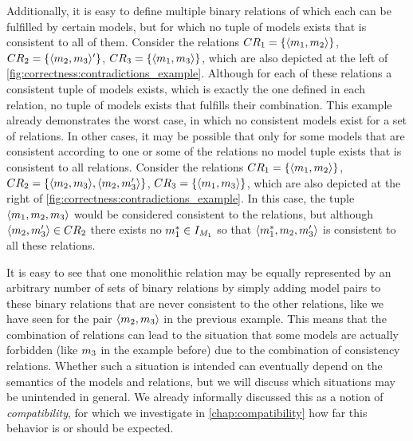 Additionally, it is easy to define multiple binary relations of which each can be fulfilled by certain models, but for which no tuple of models exists that is consistent to all of them. Consider the relations $\consistencyrelation{CR}{1} = \setted{\tupled{\model{m}{1}, \model{m}{2}}}$, $\consistencyrelation{CR}{2} = \setted{\tupled{\model{m}{2}, \model{m}{3}}'}$, $\consistencyrelation{CR}{3} = \setted{\tupled{\model{m}{1}, \model{m}{3}}}$, which are also depicted at the left of \autoref{fig:correctness:contradictions_example}.
Although for each of these relations a consistent tuple of models exists, which is exactly the one defined in each relation, no tuple of models exists that fulfills their combination.
This example already demonstrates the worst case, in which no consistent models exist for a set of relations.
In other cases, it may be possible that only for some models that are consistent according to one or some of the relations no model tuple exists that is consistent to all relations.
Consider the relations $\consistencyrelation{CR}{1} = \setted{\tupled{\model{m}{1}, \model{m}{2}}}$, $\consistencyrelation{CR}{2} = \setted{\tupled{\model{m}{2}, \model{m}{3}}, \tupled{\model{m}{2}, \model{m}{3}'}}$, $\consistencyrelation{CR}{3} = \setted{\tupled{\model{m}{1}, \model{m}{3}}}$, which are also depicted at the right of \autoref{fig:correctness:contradictions_example}.
In this case, the tuple $\tupled{\model{m}{1}, \model{m}{2}, \model{m}{3}}$ would be considered consistent to the relations, but although $\tupled{\model{m}{2}, \model{m}{3}'} \in \consistencyrelation{CR}{2}$ there exists no $\model{m}{1}^* \in \metamodelinstanceset{M}{1}$ so that $\tupled{\model{m}{1}^*, \model{m}{2}, \model{m}{3}'}$ is consistent to all these relations.

It is easy to see that one monolithic relation may be equally represented by an arbitrary number of sets of binary relations by simply adding model pairs to these binary relations that are never consistent to the other relations, like we have seen for the pair $\tupled{\model{m}{2}, \model{m}{3}}$ in the previous example.
This means that the combination of relations can lead to the situation that some models are actually forbidden (like $\model{m}{3}$ in the example before) due to the combination of consistency relations.
Whether such a situation is intended can eventually depend on the semantics of the models and relations, but we will discuss which situations may be unintended in general.
We already informally discussed this as a notion of \emph{compatibility}, for which we investigate in \autoref{chap:compatibility} how far this behavior is or should be expected.


